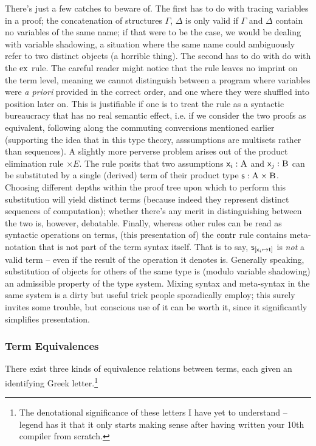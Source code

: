 There's just a few catches to beware of.
The first has to do with tracing variables in a proof; the concatenation of structures $\Gamma$, $\Delta$ is only valid if $\Gamma$ and $\Delta$ contain no variables of the same name; if that were to be the case, we would be dealing with variable shadowing, a situation where the same name could ambiguously refer to two distinct objects (a horrible thing).
The second has to do with do with the $\mathrm{ex}{}$ rule. 
The careful reader might notice that the rule leaves no imprint on the term level, meaning we cannot distinguish between a program where variables were \textit{a priori} provided in the correct order, and one where they were shuffled into position later on.
This is justifiable if one is to treat the rule as a syntactic bureaucracy that has no real semantic effect, i.e. if we consider the two proofs as equivalent, following along the commuting conversions mentioned earlier (supporting the idea that in this type theory, asssumptions are multisets rather than sequences).
A slightly more perverse problem arises out of the product elimination rule $\times E$.
The rule posits that two assumptions $\mathsf{\mathsf{x}_{\mathnormal{i}} }: \normalfont\textsc{A}$ and $\mathsf{\mathsf{x}_{\mathnormal{j}}}: \normalfont\textsc{B}$ can be substituted by a single (derived) term of their product type $\mathsf{s}: \normalfont\textsc{A}\times\normalfont\textsc{B}$. 
Choosing different depths within the proof tree upon which to perform this substitution will yield distinct terms (because indeed they represent distinct sequences of computation); whether there's any merit in distinguishing between the two is, however, debatable.
Finally, whereas other rules can be read as syntactic operations on terms, (this presentation of) the $\mathrm{contr}{}$ rule contains meta-notation that is not part of the term syntax itself.
That is to say, $\mathsf{s}_{[\mathsf{\mathsf{x}_{\mathnormal{i}} } \mapsto \mathsf{t}]}$ is \textit{not} a valid term -- even if the result of the operation it denotes is.
Generally speaking, substitution of objects for others of the same type is (modulo variable shadowing) an admissible property of the type system.
Mixing syntax and meta-syntax in the same system is a dirty but useful trick people sporadically employ; this surely invites some trouble, but conscious use of it can be worth it, since it significantly simplifies presentation.

\subsubsection{Term Equivalences}
There exist three kinds of equivalence relations between terms, each given an identifying Greek letter.\footnote{The denotational significance of these letters I have yet to understand -- legend has it that it only starts making sense after having written your 10th compiler from scratch.}

